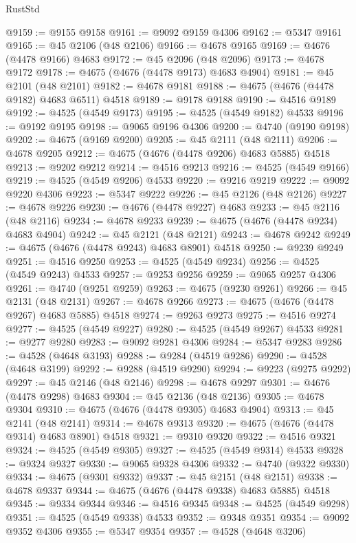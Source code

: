 \begin{lexlean}{RustStd}
\begin{coremodule}
@9159 := @9155 @9158
@9161 := @9092 @9159 @4306
@9162 := @5347 @9161
@9165 := @45 @2106 (@48 @2106)
@9166 := @4678 @9165
@9169 := @4676 (@4478 @9166) @4683
@9172 := @45 @2096 (@48 @2096)
@9173 := @4678 @9172
@9178 := @4675 (@4676 (@4478 @9173) @4683 @4904)
@9181 := @45 @2101 (@48 @2101)
@9182 := @4678 @9181
@9188 := @4675 (@4676 (@4478 @9182) @4683 @6511) @4518
@9189 := @9178 @9188
@9190 := @4516 @9189
@9192 := @4525 (@4549 @9173)
@9195 := @4525 (@4549 @9182) @4533
@9196 := @9192 @9195
@9198 := @9065 @9196 @4306
@9200 := @4740 (@9190 @9198)
@9202 := @4675 (@9169 @9200)
@9205 := @45 @2111 (@48 @2111)
@9206 := @4678 @9205
@9212 := @4675 (@4676 (@4478 @9206) @4683 @5885) @4518
@9213 := @9202 @9212
@9214 := @4516 @9213
@9216 := @4525 (@4549 @9166)
@9219 := @4525 (@4549 @9206) @4533
@9220 := @9216 @9219
@9222 := @9092 @9220 @4306
@9223 := @5347 @9222
@9226 := @45 @2126 (@48 @2126)
@9227 := @4678 @9226
@9230 := @4676 (@4478 @9227) @4683
@9233 := @45 @2116 (@48 @2116)
@9234 := @4678 @9233
@9239 := @4675 (@4676 (@4478 @9234) @4683 @4904)
@9242 := @45 @2121 (@48 @2121)
@9243 := @4678 @9242
@9249 := @4675 (@4676 (@4478 @9243) @4683 @8901) @4518
@9250 := @9239 @9249
@9251 := @4516 @9250
@9253 := @4525 (@4549 @9234)
@9256 := @4525 (@4549 @9243) @4533
@9257 := @9253 @9256
@9259 := @9065 @9257 @4306
@9261 := @4740 (@9251 @9259)
@9263 := @4675 (@9230 @9261)
@9266 := @45 @2131 (@48 @2131)
@9267 := @4678 @9266
@9273 := @4675 (@4676 (@4478 @9267) @4683 @5885) @4518
@9274 := @9263 @9273
@9275 := @4516 @9274
@9277 := @4525 (@4549 @9227)
@9280 := @4525 (@4549 @9267) @4533
@9281 := @9277 @9280
@9283 := @9092 @9281 @4306
@9284 := @5347 @9283
@9286 := @4528 (@4648 @3193)
@9288 := @9284 (@4519 @9286)
@9290 := @4528 (@4648 @3199)
@9292 := @9288 (@4519 @9290)
@9294 := @9223 (@9275 @9292)
@9297 := @45 @2146 (@48 @2146)
@9298 := @4678 @9297
@9301 := @4676 (@4478 @9298) @4683
@9304 := @45 @2136 (@48 @2136)
@9305 := @4678 @9304
@9310 := @4675 (@4676 (@4478 @9305) @4683 @4904)
@9313 := @45 @2141 (@48 @2141)
@9314 := @4678 @9313
@9320 := @4675 (@4676 (@4478 @9314) @4683 @8901) @4518
@9321 := @9310 @9320
@9322 := @4516 @9321
@9324 := @4525 (@4549 @9305)
@9327 := @4525 (@4549 @9314) @4533
@9328 := @9324 @9327
@9330 := @9065 @9328 @4306
@9332 := @4740 (@9322 @9330)
@9334 := @4675 (@9301 @9332)
@9337 := @45 @2151 (@48 @2151)
@9338 := @4678 @9337
@9344 := @4675 (@4676 (@4478 @9338) @4683 @5885) @4518
@9345 := @9334 @9344
@9346 := @4516 @9345
@9348 := @4525 (@4549 @9298)
@9351 := @4525 (@4549 @9338) @4533
@9352 := @9348 @9351
@9354 := @9092 @9352 @4306
@9355 := @5347 @9354
@9357 := @4528 (@4648 @3206)

\end{coremodule}
\end{lexlean}
